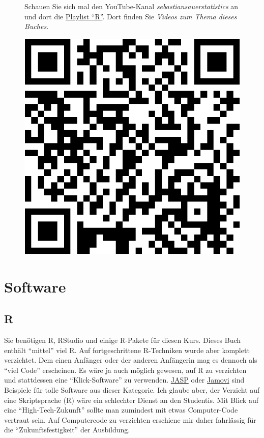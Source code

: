 \documentclass[
  letterpaper,
  oneside,
  open=any]{scrbook}
\theoremstyle{definition}
\theoremstyle{definition}
\theoremstyle{definition}
\theoremstyle{remark}
\begin{document}
\begin{figure}

\begin{minipage}{0.80\linewidth}
Schauen Sie sich mal den YouTube-Kanal \emph{sebastiansauerstatistics}
an und dort die
\href{https://www.youtube.com/playlist?list=PLRR4REmBgpIEaIyeNBgNGPgmhQJ_T1y8_}{Playlist
\enquote{R}}. Dort finden Sie \emph{Videos zum Thema dieses
Buches}.\end{minipage}%
%
\begin{minipage}{0.20\linewidth}

\begin{center}
\includegraphics[width=0.75\linewidth,height=\textheight,keepaspectratio]{005-orga_files/figure-pdf/unnamed-chunk-5-1.pdf}
\end{center}

\end{minipage}%

\end{figure}%

\section{Software}\label{software}

\subsection{R}\label{r}

Sie benötigen R, RStudio und einige R-Pakete für diesen Kurs. Dieses
Buch enthält \enquote{mittel} viel R. Auf fortgeschrittene R-Techniken
wurde aber komplett verzichtet. Dem einen Anfänger oder der anderen
Anfängerin mag es dennoch als \enquote{viel Code} erscheinen. Es wäre ja
auch möglich gewesen, auf R zu verzichten und stattdessen eine
\enquote{Klick-Software} zu verwenden.
\href{https://jasp-stats.org/}{JASP} oder
\href{https://www.jamovi.org/}{Jamovi} sind Beispiele für tolle Software
aus dieser Kategorie. Ich glaube aber, der Verzicht auf eine
Skriptsprache (R) wäre ein schlechter Dienst an den Studentis. Mit Blick
auf eine \enquote{High-Tech-Zukunft} sollte man zumindest mit etwas
Computer-Code vertraut sein. Auf Computercode zu verzichten erschiene
mir daher fahrlässig für die \enquote{Zukunftsfestigkeit} der
Ausbildung.
\end{document}
